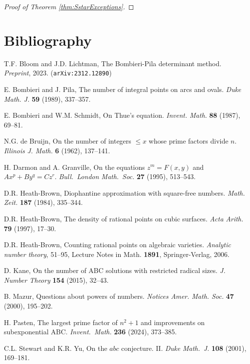 \begin{proof}[Proof of Theorem \ref{thm:SstarExceptions}]
\end{proof}


\chapter{Bibliography}
\begin{thebibliography}{99}

T.F. Bloom and J.D. Lichtman, The Bombieri-Pila determinant method. {\em Preprint}, 2023. ({\tt arXiv:2312.12890})

E. Bombieri and J. Pila, The number of integral points on arcs and ovals. {\em Duke Math. J.} {\bf 59} (1989), 337--357.

E. Bombieri and W.M. Schmidt, On Thue's equation. {\em Invent. Math.} {\bf 88} (1987), 69--81.

N.G. de Bruijn, On the number of integers {$\leq x$} whose prime factors divide {$n$}.  {\em Illinois J. Math.} {\bf 6} (1962), {137--141}.

H. Darmon and A. Granville, On the equations $z^m=F(x,y)$ and $Ax^p+By^q=Cz^r$. {\em Bull.\ London Math.\ Soc.} {\bf 27} (1995), 513--543.

D.R. Heath-Brown, Diophantine approximation with square-free numbers.  {\em Math. Zeit.} {\bf 187} (1984), {335--344}.

D.R. Heath-Brown, The density of rational points on cubic surfaces. {\em Acta Arith.} {\bf 79} (1997), 17--30.

D.R. Heath-Brown, Counting rational points on algebraic varieties. {\em Analytic number theory}, 51--95, Lecture Notes in Math. {\bf 1891}, Springer-Verlag, 2006.

D. Kane, On the number of ABC solutions with restricted radical sizes. {\em J. Number Theory} {\bf 154} (2015), 32--43.

B. Mazur, Questions about powers of numbers. {\em Notices Amer. Math. Soc.} {\bf 47} (2000), 195--202.

H. Pasten, The largest prime factor of $n^2+1$ and improvements on subexponential ABC. {\em Invent.\ Math.} {\bf 236} (2024), 373--385.

C.L. Stewart and K.R. Yu, On the $abc$ conjecture. II. {\it Duke Math.\ J.} {\bf 108} (2001), 169--181.

\end{thebibliography}

